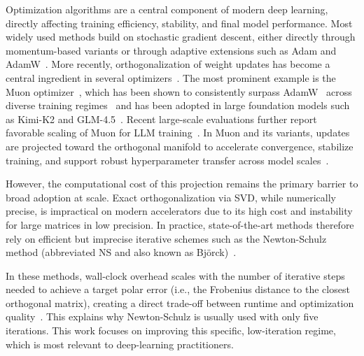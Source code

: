 Optimization algorithms are a central component of modern deep learning, directly affecting training efficiency, stability, and final model performance. Most widely used methods build on stochastic gradient descent, either directly through momentum-based variants or through adaptive extensions such as Adam and AdamW~\cite{kingma2014adam,loshchilovdecoupled}. More recently, orthogonalization of weight updates has become a central ingredient in several optimizers~\cite{bernstein2024oldoptimizernewnorm, bernstein2024modulardualitydeeplearning}.
The most prominent example is the Muon optimizer~\cite{jordan2024muon}, which has been shown to consistently surpass AdamW~\cite{kingma2014adam,loshchilovdecoupled} across diverse training regimes~\cite{wen_fantastic_2025} and has been adopted in large foundation models such as Kimi-K2 and GLM-4.5~\cite{kimi2025k2,zeng2025glm}. 
Recent large-scale evaluations further report favorable scaling of Muon for LLM training~\cite{liu2025muonscalablellmtraining, shah2025practical}. 
In Muon and its variants, updates are projected toward the orthogonal manifold to
 accelerate convergence, stabilize training, and support robust hyperparameter transfer across model scales~\cite{bernstein2025deriving, bernstein2024modulardualitydeeplearning, large2024scalable, pethick2025training}.

However, the computational cost of this projection remains the primary barrier to broad adoption at scale. Exact orthogonalization via SVD, while numerically precise, is impractical on modern accelerators due to its high cost and instability for large matrices in low precision.
In practice, state-of-the-art methods therefore rely on efficient but imprecise iterative schemes such as the Newton-Schulz method (abbreviated NS and also known as Bj\"orck)~\cite{bjorck1971iterative, cesista2025muonoptcoeffs}.

In these methods, wall-clock overhead scales with the number of iterative steps needed to achieve a target polar error (i.e., the Frobenius distance to the closest orthogonal matrix), creating a direct 
trade-off %
between runtime and optimization quality~\cite{shulgin2025beyond}. 
This explains why Newton-Schulz is usually used with only five iterations. This work focuses on improving this specific, low-iteration regime, which is most relevant to deep-learning practitioners.


